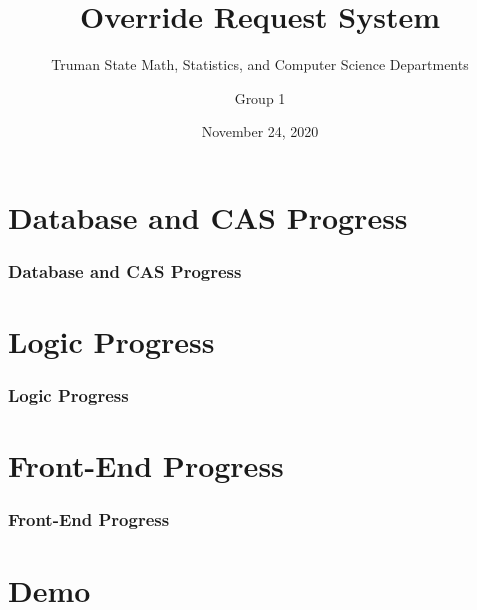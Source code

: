 \documentclass[aspectratio=169, t]{beamer}
\title{Override Request System}
\subtitle{Truman State Math, Statistics, and Computer Science Departments}
\author[Group 1]{Group 1}
\date{November 24, 2020}
\begin{document}
\maketitle

\section{Database and CAS Progress}
\begin{frame}
  \frametitle{Database and CAS Progress}

  

\end{frame}

\section{Logic Progress}
\begin{frame}
  \frametitle{Logic Progress}

  

\end{frame}

\section{Front-End Progress}
\begin{frame}
  \frametitle{Front-End Progress}

  

\end{frame}

\section{Demo}

\section{}
\maketitle
\end{document}
